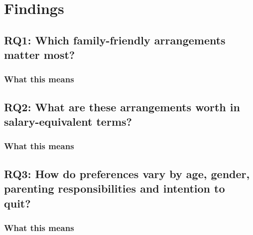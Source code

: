 \chapter{Findings}


\section{RQ1: Which family-friendly arrangements matter most?}


\subsection*{What this means}

\section{RQ2: What are these arrangements worth in salary-equivalent terms?}

\subsection*{What this means}

\section{RQ3: How do preferences vary by age, gender, parenting responsibilities and intention to quit?}

\subsection*{What this means}
